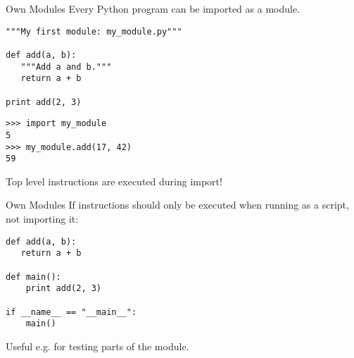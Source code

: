\begin{frame}[fragile]{Own Modules}
Every Python program can be imported as a module.
\begin{lstlisting}[style=Python]
"""My first module: my_module.py"""

def add(a, b):
   """Add a and b."""
   return a + b

print add(2, 3)
\end{lstlisting}
\begin{lstlisting}[style=Shell]
>>> import my_module
5
>>> my_module.add(17, 42)
59
\end{lstlisting}
Top level instructions are executed during import!
\end{frame}

\begin{frame}[fragile]{Own Modules}
If instructions should only be executed when running as a script, not importing it:
\vspace{3mm}
\begin{lstlisting}[style=Python]
def add(a, b):
   return a + b

def main():
    print add(2, 3)

if __name__ == "__main__":
    main()
\end{lstlisting}
Useful e.g. for testing parts of the module.
\end{frame}

